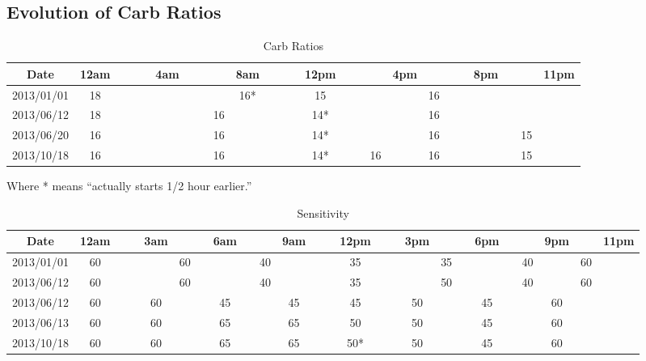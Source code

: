 \subsection{Evolution of Carb Ratios}

\begin{table}[h]
\caption{Carb Ratios}
\footnotesize
\begin{center}
\begin{tabular}{|c|c|c|c|c|c|c|c|c|c|c|c|c|c|c|c|c|c|c|c|c|c|c|c|c|}
\hline
Date       & 12am & & & & 4am & & &    & 8am & & & & 12pm & & &    & 4pm &    & & & 8pm & &    & 11pm \\ \hline
2013/01/01 & 18   & & & &     & & &    & 16* & & & & 15   & & &    &     & 16 & & &     & &    &      \\
2013/06/12 & 18   & & & &     & & & 16 &     & & & & 14*  & & &    &     & 16 & & &     & &    &      \\
2013/06/20 & 16   & & & &     & & & 16 &     & & & & 14*  & & &    &     & 16 & & &     & & 15 &      \\
2013/10/18 & 16   & & & &     & & & 16 &     & & & & 14*  & & & 16 &     & 16 & & &     & & 15 &      \\
\hline
\end{tabular}
\end{center}
\label{default}
\end{table}%
Where * means ``actually starts 1/2 hour earlier.''

\begin{table}[h]
\caption{Sensitivity}
\footnotesize
\begin{center}
\begin{tabular}{|c|c|c|c|c|c|c|c|c|c|c|c|c|c|c|c|c|c|c|c|c|c|c|c|c|}
\hline
Date       & 12am & & & 3am &    & &6am & &    & 9am & & & 12pm & & & 3pm &    & & 6pm & &    & 9pm &    & 11pm \\ \hline
2013/01/01 & 60   & & &     & 60 & &    & & 40 &     & & & 35   & & &     & 35 & &     & & 40 &     & 60 &      \\
2013/06/12 & 60   & & &     & 60 & &    & & 40 &     & & & 35   & & &     & 50 & &     & & 40 &     & 60 &      \\
2013/06/12 & 60   & & & 60  &    & & 45 & &    & 45  & & & 45   & & & 50  &    & & 45  & &    & 60  &    &      \\
2013/06/13 & 60   & & & 60  &    & & 65 & &    & 65  & & & 50   & & & 50  &    & & 45  & &    & 60  &    &      \\
2013/10/18 & 60   & & & 60  &    & & 65 & &    & 65  & & & 50*  & & & 50  &    & & 45  & &    & 60  &    &      \\
\hline
\end{tabular}
\end{center}
\label{default}
\end{table}%

